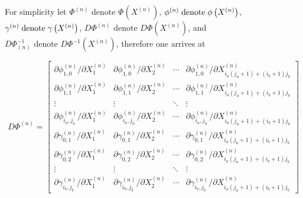 \documentclass{article}
\newcommand{\pard}[2]{\partial #1 / \partial #2}
\newcommand{\spbox}[1]{ \text{ #1 }} %
\begin{document}
For simplicity let $\Phi ^{\left(n\right)} \spbox{denote} \Phi
\left(X^{\left(n\right)} \right)$, $\phi ^{\left(n\right)} {\rm \; denote\;
} \phi \left(X^{\left(n\right)} \right)$, $\gamma ^{\left(n\right)} {\rm \;
denote\; } \gamma \left(X^{\left(n\right)} \right)$, $D\Phi ^{\left(n\right)}
\spbox{denote}D\Phi \left(X^{\left(n\right)} \right)$, and $D\Phi
_{\left(n\right)}^{-1} \spbox{denote}D\Phi ^{-1} \left(X^{\left(n\right)}
\right)$, therefore one arrives at

\begin{equation} \label{Jacobian)} 
    D\Phi ^{\left(n\right)} =\left[\begin{array}{cccc} 
    {\pard{\phi_{1,0}^{(n)}}{X_{1}^{(n)}} } 
    & {\pard{\phi_{1,0}^{(n)}}{X_{2}^{(n)}} } 
    & {\cdots } 
    & {\pard{\phi_{1,0}^{(n)}}{X_{i_{a} \left(j_{a} +1\right)+\left(i_{b} + 1\right)j_{b} }^{(n)}} } \\ 
    
    {\pard{\phi_{1,1}^{(n)}}{X_{1}^{(n)}} } 
    & {\pard{\phi_{1,1}^{(n)}}{X_{2}^{(n)}} } 
    & {\cdots } 
    & {\pard{\phi_{1,1}^{(n)}}{X_{i_{a} \left(j_{a} +1\right)+\left(i_{b} +1\right)j_{b} }^{(n)}} } \\ 
    
    {\vdots } & {\vdots } & {\ddots } & {\vdots } \\ 
    
    {\pard{\phi_{i_{a} ,j_{a} }^{(n)}}{X_{1}^{(n)}} } 
    & {\pard{\phi_{i_{a},j_{a} }^{(n)}}{X_{2}^{(n)}} } 
    & {\cdots } 
    & {\pard{\phi_{i_{a} ,j_{a}}^{(n)}}{X_{i_{a} \left(j_{a} +1\right)+\left(i_{b} +1\right)j_{b} }^{(n)}} } \\

    {\pard{\gamma_{0,1}^{(n)}}{X_{1}^{(n)}}} 
    & {\pard{\gamma_{0,1}^{(n)}}{X_{2}^{(n)}} } 
    & {\cdots } 
    &{\pard{\gamma_{0,1}^{(n)}}{X_{i_{a} \left(j_{a} +1\right)+\left(i_{b}+1\right)j_{b} }^{(n)}} } \\

    {\pard{\gamma_{0,2}^{(n)}}{X_{1}^{(n)}} } 
    & {\pard{\gamma_{0,2}^{(n)}}{X_{2}^{(n)} }} 
    & {\cdots } 
    & {\pard{\gamma_{0,2}^{(n)}}{X_{i_{a} \left(j_{a}+1\right)+\left(i_{b} +1\right)j_{b} }^{\left(n\right)} }} \\ 
    
    {\vdots } & {\vdots } & {\ddots } & {\vdots } \\

    {\pard{\gamma_{i_{b} ,j_{b}}^{(n)}}{X_{1}^{(n)}} } 
    & {\pard{\gamma_{i_{b} ,j_{b} }^{(n)}}{X_{2}^{(n)}} }
    & {\cdots } 
    & {\pard{\gamma_{i_{b} ,j_{b} }^{(n)}}{X_{i_{a} \left(j_{a}+1\right)+\left(i_{b} +1\right)j_{b} }^{(n)}} } 
\end{array} \right] \end{equation}
\end{document}
